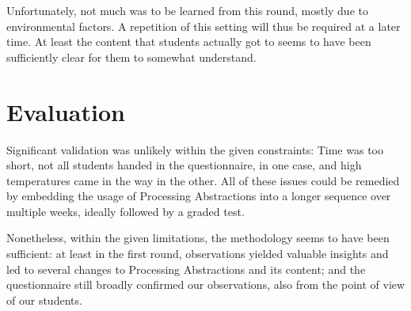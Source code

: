 Unfortunately, not much was to be learned from this round, mostly due to environmental factors. A repetition of this setting will thus be required at a later time. At least the content that students actually got to seems to have been sufficiently clear for them to somewhat understand.



\section{Evaluation}

Significant validation was unlikely within the given constraints: Time was too short, not all students handed in the questionnaire, in one case, and high temperatures came in the way in the other. All of these issues could be remedied by embedding the usage of Processing Abstractions into a longer sequence over multiple weeks, ideally followed by a graded test.

Nonetheless, within the given limitations, the methodology seems to have been sufficient: at least in the first round, observations yielded valuable insights and led to several changes to Processing Abstractions and its content; and the questionnaire still broadly confirmed our observations, also from the point of view of our students.

